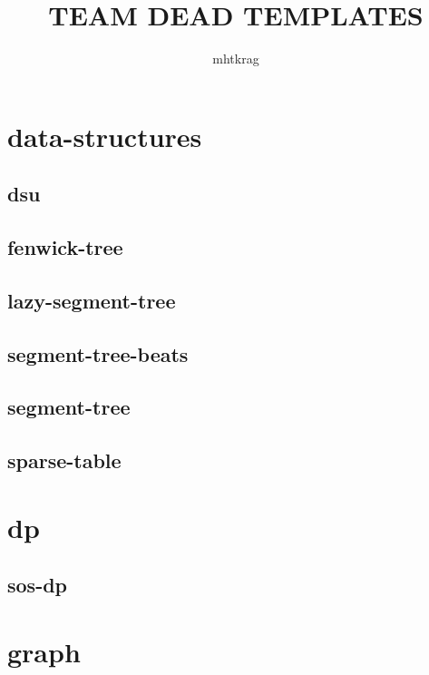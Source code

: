 \documentclass[a4paper, twocolumn]{article}
\title{TEAM DEAD TEMPLATES}
\author{mhtkrag}
\begin{document}
\begin{titlepage}
\maketitle
\thispagestyle{empty}
\pagebreak
\pagestyle{fancy}
\lhead{}
\rhead{}
\cfoot{}
\tableofcontents
\end{titlepage}

\pagestyle{fancy}
\cfoot{- \thepage \ -}
  
\section{data-structures}
\subsection{dsu}

\subsection{fenwick-tree}

\subsection{lazy-segment-tree}

\subsection{segment-tree-beats}

\subsection{segment-tree}

\subsection{sparse-table}

\section{dp}
\subsection{sos-dp}

\section{graph}
\end{document}
